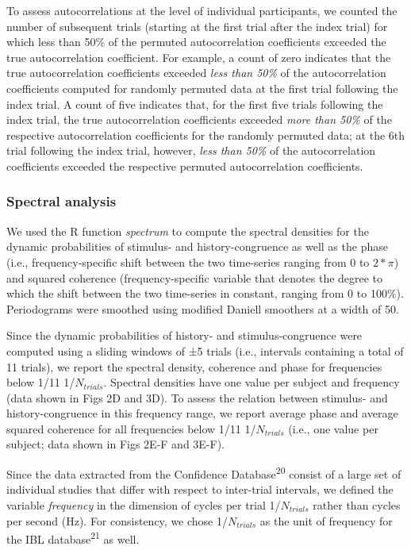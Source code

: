 \documentclass[
]{article}
\begin{document}
To assess autocorrelations at the level of individual participants, we
counted the number of subsequent trials (starting at the first trial
after the index trial) for which less than 50\% of the permuted
autocorrelation coefficients exceeded the true autocorrelation
coefficient. For example, a count of zero indicates that the true
autocorrelation coefficients exceeded \emph{less than 50\%} of the
autocorrelation coefficients computed for randomly permuted data at the
first trial following the index trial. A count of five indicates that,
for the first five trials following the index trial, the true
autocorrelation coefficients exceeded \emph{more than 50\%} of the
respective autocorrelation coefficients for the randomly permuted data;
at the 6th trial following the index trial, however, \emph{less than
50\%} of the autocorrelation coefficients exceeded the respective
permuted autocorrelation coefficients.

\hypertarget{spectral-analysis}{%
\subsubsection{Spectral analysis}\label{spectral-analysis}}

We used the R function \emph{spectrum} to compute the spectral densities
for the dynamic probabilities of stimulus- and history-congruence as
well as the phase (i.e., frequency-specific shift between the two
time-series ranging from 0 to \(2*\pi\)) and squared coherence
(frequency-specific variable that denotes the degree to which the shift
between the two time-series in constant, ranging from 0 to 100\%).
Periodograms were smoothed using modified Daniell smoothers at a width
of 50.

Since the dynamic probabilities of history- and stimulus-congruence were
computed using a sliding windows of ±5 trials (i.e., intervals
containing a total of 11 trials), we report the spectral density,
coherence and phase for frequencies below 1/11 1/\(N_{trials}\).
Spectral densities have one value per subject and frequency (data shown
in Figs 2D and 3D). To assess the relation between stimulus- and
history-congruence in this frequency range, we report average phase and
average squared coherence for all frequencies below 1/11
1/\(N_{trials}\) (i.e., one value per subject; data shown in Figs 2E-F
and 3E-F).

Since the data extracted from the Confidence
Database\textsuperscript{20} consist of a large set of individual
studies that differ with respect to inter-trial intervals, we defined
the variable \emph{frequency} in the dimension of cycles per trial
1/\(N_{trials}\) rather than cycles per second (Hz). For consistency, we
chose 1/\(N_{trials}\) as the unit of frequency for the IBL
database\textsuperscript{21} as well.
\end{document}
